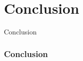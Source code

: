 \section{Conclusion}

\begin{frame}
\begin{center}
     	\huge Conclusion
     \end{center}
\end{frame}

\begin{frame}
\frametitle{Conclusion}
\end{frame}
